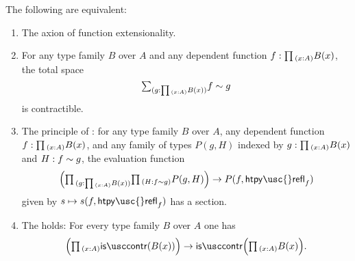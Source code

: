 \begin{thm}\label{thm:funext_wkfunext}
The following are equivalent:
\begin{enumerate}
\item The axion of function extensionality.
\item For any type family $B$ over $A$ and any dependent function $f:\prd{x:A}B(x)$, the total space
  \begin{equation*}
    \sm{g:\prd{x:A}B(x)}f\htpy g
  \end{equation*}
  is contractible.
\item
  The principle of :
  for any type family $B$ over $A$, any dependent function $f:\prd{x:A}B(x)$, and any family of types $P(g,H)$ indexed by $g:\prd{x:A}B(x)$ and $H:f\sim g$, the evaluation function
\begin{equation*}
\Big(\prd{g:\prd{x:A}B(x)}{H:f\htpy g}P(g,H)\Big)\to P(f,\mathsf{htpy\usc{}refl}_f)
\end{equation*}
given by $s\mapsto s(f,\mathsf{htpy\usc{}refl}_f)$ has a section.
\item The  holds: For every type family $B$ over $A$ one has
\begin{equation*}
\Big(\prd{x:A}\iscontr(B(x))\Big)\to\iscontr\Big(\prd{x:A}B(x)\Big).
\end{equation*}
\end{enumerate}
\end{thm}

